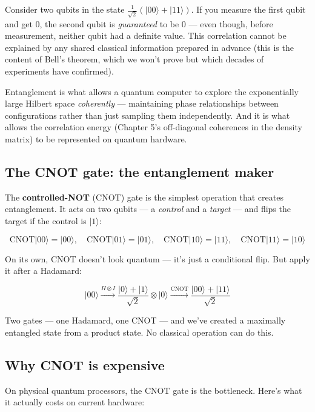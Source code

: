 \documentclass[
  11pt,
  oneside]{book}
\begin{document}
Consider two qubits in the state
\(\frac{1}{\sqrt{2}}(\lvert 00\rangle + \lvert 11\rangle)\). If you
measure the first qubit and get 0, the second qubit is \emph{guaranteed}
to be 0 --- even though, before measurement, neither qubit had a
definite value. This correlation cannot be explained by any shared
classical information prepared in advance (this is the content of Bell's
theorem, which we won't prove but which decades of experiments have
confirmed).

Entanglement is what allows a quantum computer to explore the
exponentially large Hilbert space \emph{coherently} --- maintaining
phase relationships between configurations rather than just sampling
them independently. And it is what allows the correlation energy
(Chapter 5's off-diagonal coherences in the density matrix) to be
represented on quantum hardware.

\subsection{The CNOT gate: the entanglement
maker}\label{the-cnot-gate-the-entanglement-maker}

The \textbf{controlled-NOT} (CNOT) gate is the simplest operation that
creates entanglement. It acts on two qubits --- a \emph{control} and a
\emph{target} --- and flips the target if the control is
\(\lvert 1\rangle\):

\[\text{CNOT}\lvert 00\rangle = \lvert 00\rangle, \quad \text{CNOT}\lvert 01\rangle = \lvert 01\rangle, \quad \text{CNOT}\lvert 10\rangle = \lvert 11\rangle, \quad \text{CNOT}\lvert 11\rangle = \lvert 10\rangle\]

On its own, CNOT doesn't look quantum --- it's just a conditional flip.
But apply it after a Hadamard:

\[\lvert 00\rangle \xrightarrow{H \otimes I} \frac{\lvert 0\rangle + \lvert 1\rangle}{\sqrt{2}} \otimes \lvert 0\rangle \xrightarrow{\text{CNOT}} \frac{\lvert 00\rangle + \lvert 11\rangle}{\sqrt{2}}\]

Two gates --- one Hadamard, one CNOT --- and we've created a maximally
entangled state from a product state. No classical operation can do
this.

\subsection{Why CNOT is expensive}\label{why-cnot-is-expensive}

On physical quantum processors, the CNOT gate is the bottleneck. Here's
what it actually costs on current hardware:
\end{document}

